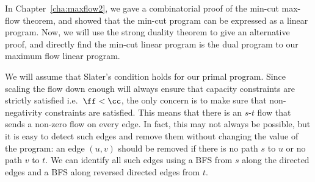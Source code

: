 \begin{example}
  In Chapter~\ref{cha:maxflow2}, we gave a combinatorial proof of the min-cut max-flow
  theorem, and showed that the min-cut program can be expressed as a
  linear program. Now, we will use the strong duality theorem to give
  an alternative proof, and directly find the min-cut linear program
  is the dual program to our maximum flow linear program.

  We will assume that Slater's condition holds for our primal
  program.
  Since scaling the flow down enough will always ensure that
  capacity constraints are strictly satisfied i.e.\ $\ff < \cc$, the
  only concern is to make sure that non-negativity constraints are satisfied.
  This means that there is an $s$-$t$ flow that sends a non-zero flow
  on every edge.
  In fact, this may not always be possible, but it is
  easy to detect such edges and remove them without changing the value
  of the program: an edge $(u,v)$ should be removed if there is no
  path $s$ to $u$ or no path $v$ to $t$. We can identify all such
  edges using a BFS from $s$ along
  the directed edges and a BFS along reversed directed edges from $t$.


\end{example}

